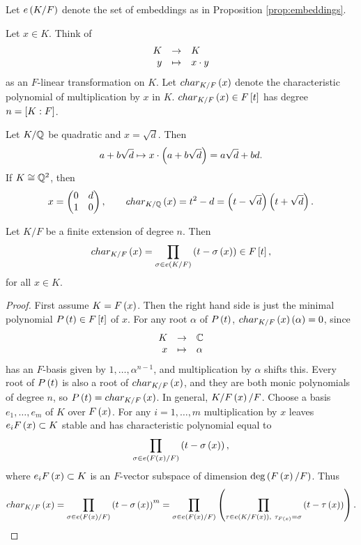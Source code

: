 \begin{notation*}
Let $ e\rb{K / F} $ denote the set of embeddings as in Proposition \ref{prop:embeddings}.
\end{notation*}

Let $ x \in K $. Think of
$$ \function{K}{K}{y}{x \cdot y} $$
as an $ F $-linear transformation on $ K $. Let $ char_{K / F}\rb{x} $ denote the characteristic polynomial of multiplication by $ x $ in $ K $. $ char_{K / F}\rb{x} \in F\sb{t} $ has degree $ n = \sb{K : F} $.

\begin{example*}
Let $ K / \Q $ be quadratic and $ x = \sqrt{d} $. Then
$$ a + b\sqrt{d} \mapsto x \cdot \rb{a + b\sqrt{d}} = a\sqrt{d} + bd. $$
If $ K \cong \Q^2 $, then
$$ x = \twobytwo{0}{d}{1}{0}, \qquad char_{K / \Q}\rb{x} = t^2 - d = \rb{t - \sqrt{d}}\rb{t + \sqrt{d}}. $$
\end{example*}

\begin{proposition}
Let $ K / F $ be a finite extension of degree $ n $. Then
$$ char_{K / F}\rb{x} = \prod_{\sigma \in e\rb{K / F}} \rb{t - \sigma\rb{x}} \in F\sb{t}, $$
for all $ x \in K $.
\end{proposition}

\pagebreak

\begin{proof}
First assume $ K = F\rb{x} $. Then the right hand side is just the minimal polynomial $ P\rb{t} \in F\sb{t} $ of $ x $. For any root $ \alpha $ of $ P\rb{t} $, $ char_{K / F}\rb{x}\rb{\alpha} = 0 $, since
$$ \function{K}{\C}{x}{\alpha} $$
has an $ F $-basis given by $ 1, \dots, \alpha^{n - 1} $, and multiplication by $ \alpha $ shifts this. Every root of $ P\rb{t} $ is also a root of $ char_{K / F}\rb{x} $, and they are both monic polynomials of degree $ n $, so $ P\rb{t} = char_{K / F}\rb{x} $. In general, $ K / F\rb{x} / F $. Choose a basis $ e_1, \dots, e_m $ of $ K $ over $ F\rb{x} $. For any $ i = 1, \dots, m $ multiplication by $ x $ leaves $ e_iF\rb{x} \subset K $ stable and has characteristic polynomial equal to
$$ \prod_{\sigma \in e\rb{F\rb{x} / F}} \rb{t - \sigma\rb{x}}, $$
where $ e_iF\rb{x} \subset K $ is an $ F $-vector subspace of dimension $ \deg\rb{F\rb{x} / F} $. Thus
$$ char_{K / F}\rb{x} = \prod_{\sigma \in e\rb{F\rb{x} / F}} \rb{t - \sigma\rb{x}}^m = \prod_{\sigma \in e\rb{F\rb{x} / F}} \rb{\prod_{\tau \in e\rb{K / F\rb{x}}, \ \tau_{F\rb{x}} = \sigma} \rb{t - \tau\rb{x}}}. $$
\end{proof}

